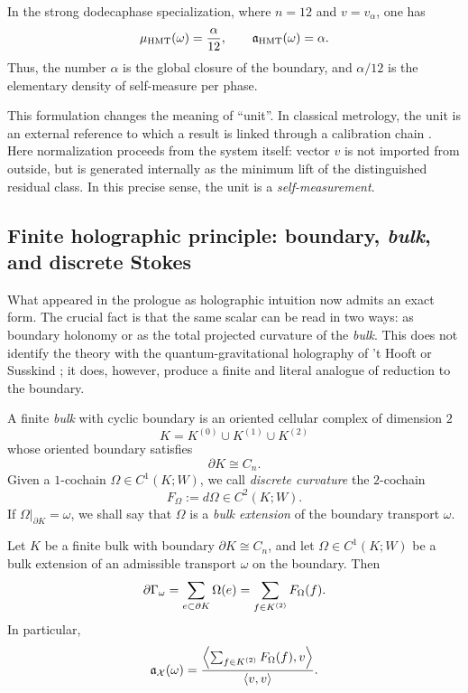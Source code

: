 \begin{corollary}\label{cor:self-measurement-hmt}
In the strong dodecaphase specialization, where $n=12$ and $v=v_\alpha$, one has
\[
\mu_{\mathrm{HMT}}(\omega)=\frac{\alpha}{12},
\qquad
\mathfrak a_{\mathrm{HMT}}(\omega)=\alpha.
\]
Thus, the number $\alpha$ is the global closure of the boundary, and $\alpha/12$ is the elementary density of
self-measure per phase.
\end{corollary}

\begin{remark}
This formulation changes the meaning of ``unit''. In classical metrology, the unit is an
external reference to which a result is linked through a calibration chain
\cite{NISTTraceability2023,BIPMSI2019}. Here normalization proceeds from the system itself: vector
$v$ is not imported from outside, but is generated internally as the minimum lift of the
distinguished residual class. In this precise sense, the unit is a \emph{self-measurement}.
\end{remark}

\subsection{Finite holographic principle: boundary, \emph{bulk}, and discrete Stokes}

What appeared in the prologue as holographic intuition now admits an exact form. The crucial
fact is that the same scalar can be read in two ways: as boundary holonomy or as the
total projected curvature of the \emph{bulk}. This does not identify the theory with the
quantum-gravitational holography of 't Hooft or Susskind \cite{tHooft1993,Susskind1995}; it does, however,
produce a finite and literal analogue of reduction to the boundary.

\begin{definition}
A finite \emph{bulk} with cyclic boundary is an oriented cellular complex of dimension $2$
\[
K=K^{(0)}\cup K^{(1)}\cup K^{(2)}
\]
whose oriented boundary satisfies
\[
\partial K\cong C_n.
\]
Given a $1$-cochain $\Omega\in C^1(K;W)$, we call \emph{discrete curvature} the
$2$-cochain
\[
F_\Omega:=d\Omega\in C^2(K;W).
\]
If $\Omega\vert_{\partial K}=\omega$, we shall say that $\Omega$ is a \emph{bulk extension} of the
boundary transport $\omega$.
\end{definition}

\begin{theorem}\label{thm:discrete-stokes-projected}
Let $K$ be a finite bulk with boundary $\partial K\cong C_n$, and let $\Omega\in C^1(K;W)$ be a
bulk extension of an admissible transport $\omega$ on the boundary. Then
\[
\partial\Gamma_\omega
=
\sum_{e\subset \partial K}\Omega(e)
=
\sum_{f\in K^{(2)}}F_\Omega(f).
\]
In particular,
\[
\mathfrak a_\mathcal X(\omega)
=
\frac{\left\langle \sum_{f\in K^{(2)}}F_\Omega(f),v\right\rangle}{\langle v,v\rangle}.
\]
\end{theorem}

